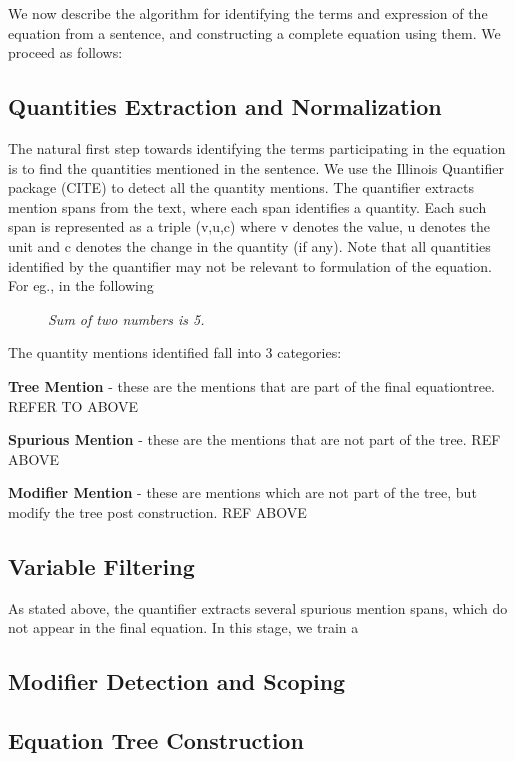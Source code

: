 We now describe the algorithm for identifying the terms and expression of the equation from a sentence, and constructing a complete equation using them. We proceed as follows:
\subsection{Quantities Extraction and Normalization}
The natural first step towards identifying the terms participating in the equation is to find the quantities mentioned in the sentence. We use the Illinois Quantifier package (CITE) to detect all the quantity mentions.
The quantifier extracts mention spans from the text, where each span identifies a quantity. Each such span is represented as a triple (v,u,c) where v denotes the value, u denotes the unit and c denotes the change in the quantity (if any).
Note that all quantities identified by the quantifier may not be relevant to formulation of the equation. For eg., in the following
\begin{figure}
  \centering
\emph{Sum of two numbers is 5.}
\end{figure}
The quantity mentions identified fall into 3 categories:
\begin{inparaenum}
\item {\bf Tree Mention} - these are the mentions that are part of the final equationtree. REFER TO ABOVE
\item {\bf Spurious Mention} - these are the mentions that are not part of the tree.
  REF ABOVE
\item {\bf Modifier Mention} - these are mentions which are not part of the tree, but modify the tree post construction. REF ABOVE
\end{inparaenum}

\subsection{Variable Filtering}
As stated above, the quantifier extracts several spurious mention spans, which do not appear in the final equation. In this stage, we train a

\subsection{Modifier Detection and Scoping}
\subsection{Equation Tree Construction}
